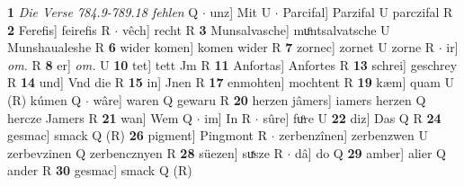 \documentclass[8pt,a4paper,notitlepage]{article}
\begin{document}
\begin{table}[ht]
\begin{minipage}[t]{0.5\linewidth}
\textbf{1} \textit{Die Verse 784.9-789.18 fehlen} Q   $\cdot$ unz] Mit U  $\cdot$ Parcifal] Parzifal U parczifal R \textbf{2} Ferefis] feirefis R  $\cdot$ vêch] recht R \textbf{3} Munsalvasche] muͦntsalvatsche U Munshaualeshe R \textbf{6} wider komen] komen wider R \textbf{7} zornec] zornet U zorne R  $\cdot$ ir] \textit{om.} R \textbf{8} er] \textit{om.} U \textbf{10} tet] tett Jm R \textbf{11} Anfortas] Anfortes R \textbf{13} schrei] geschrey R \textbf{14} und] Vnd die R \textbf{15} in] Jnen R \textbf{17} enmohten] mochtent R \textbf{19} kæm] quam U (R) kúmen Q  $\cdot$ wâre] waren Q gewaru R \textbf{20} herzen jâmers] iamers herzen Q hercze Jamers R \textbf{21} wan] Wem Q  $\cdot$ im] In R  $\cdot$ sûre] fuͦre U \textbf{22} diz] Das Q R \textbf{24} gesmac] smack Q (R) \textbf{26} pigment] Pingmont R  $\cdot$ zerbenzînen] zerbenzwen U zerbevzinen Q zerbencznyen R \textbf{28} süezen] suͯsze R  $\cdot$ dâ] do Q \textbf{29} amber] alier Q ander R \textbf{30} gesmac] smack Q (R) \newline
\end{minipage}
\end{table}
\end{document}
